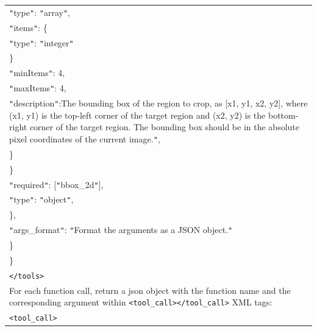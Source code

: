 \documentclass[11pt]{article}
\begin{document}
\begin{table}[htbp]
{\begin{tabular}{p{13cm}}
        \hspace{50pt} \texttt{"}type\texttt{"}: \texttt{"}array\texttt{"}, \\
        \hspace{50pt} \texttt{"}items\texttt{"}: \{   \\
        \hspace{60pt} \texttt{"}type\texttt{"}: \texttt{"}integer\texttt{"} \\
        \hspace{50pt} \} \\ 
        \hspace{50pt} \texttt{"}minItems\texttt{"}: 4, \\
        \hspace{50pt} \texttt{"}maxItems\texttt{"}: 4, \\
        \hspace{50pt} \texttt{"}description\texttt{"}:The bounding box of the region to crop, as [x1, y1, x2, y2], where (x1, y1) is the top-left corner of the target region and (x2, y2) is the bottom-right corner of the target region. The bounding box should be in the absolute pixel coordinates of the current image.\texttt{"}, \\
        \hspace{50pt} \} \\ 
        \hspace{40pt} \} \\
        \hspace{30pt} \texttt{"}required\texttt{"}: [\texttt{"}bbox\_2d\texttt{"}], \\
        \hspace{30pt} \texttt{"}type\texttt{"}: \texttt{"}object\texttt{"}, \\
        \hspace{20pt} \}, \\
        \hspace{10pt} \texttt{"}args\_format\texttt{"}: \texttt{"}Format the arguments as a JSON object.\texttt{"} \\
        \hspace{10pt} \} \\
        \} \\
        \texttt{</tools>} \\
        For each function call, return a json object with the function name and the corresponding argument within \texttt{<tool\_call></tool\_call>} XML tags: \\
        \texttt{<tool\_call>} \\

\end{tabular}}
\end{table}
\end{document}

